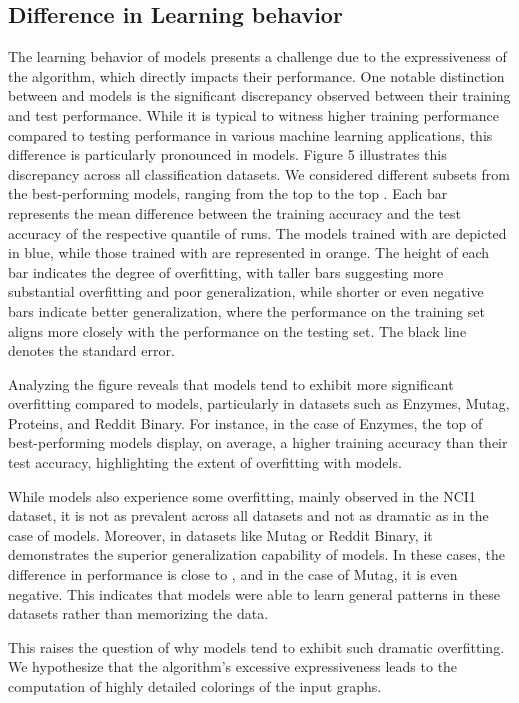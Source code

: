 \subsection{Difference in Learning behavior}
The learning behavior of \wlnn models presents a challenge due to the expressiveness of the \wl algorithm, which directly impacts their performance. One notable distinction between \wlnn and \gnn models is the significant discrepancy observed between their training and test performance. While it is typical to witness higher training performance compared to testing performance in various machine learning applications, this difference is particularly pronounced in \wlnn models. Figure 5 illustrates this discrepancy across all classification datasets. We considered different subsets from the best-performing models, ranging from the top  to the top . Each bar represents the mean difference between the training accuracy and the test accuracy of the respective quantile of runs. The models trained with \wlnn are depicted in blue, while those trained with \gnn are represented in orange. The height of each bar indicates the degree of overfitting, with taller bars suggesting more substantial overfitting and poor generalization, while shorter or even negative bars indicate better generalization, where the performance on the training set aligns more closely with the performance on the testing set. The black line denotes the standard error.

Analyzing the figure reveals that \wlnn models tend to exhibit more significant overfitting compared to \gnn models, particularly in datasets such as Enzymes, Mutag, Proteins, and Reddit Binary. For instance, in the case of Enzymes, the top  of best-performing \wlnn models display, on average, a  higher training accuracy than their test accuracy, highlighting the extent of overfitting with \wlnn models.

While \gnn models also experience some overfitting, mainly observed in the NCI1 dataset, it is not as prevalent across all datasets and not as dramatic as in the case of \wlnn models. Moreover, in datasets like Mutag or Reddit Binary, it demonstrates the superior generalization capability of \gnn models. In these cases, the difference in performance is close to , and in the case of Mutag, it is even negative. This indicates that \gnn models were able to learn general patterns in these datasets rather than memorizing the data.

This raises the question of why \wlnn models tend to exhibit such dramatic overfitting. We hypothesize that the \wl algorithm's excessive expressiveness leads to the computation of highly detailed colorings of the input graphs.

